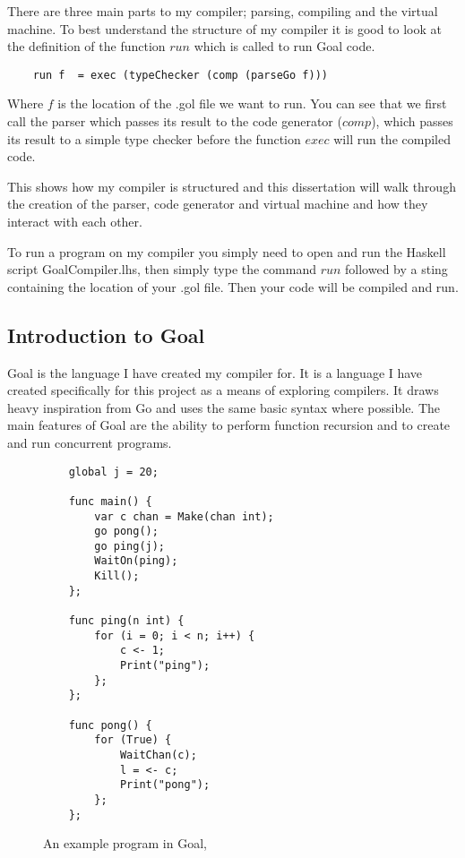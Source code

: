 There are three main parts to my compiler; parsing, compiling and the virtual machine. To best understand the structure of my compiler it is good to look at the definition of the function $run$ which is called to run Goal code.

\begin{lstlisting}
 	run f  = exec (typeChecker (comp (parseGo f)))
\end{lstlisting}

Where $f$ is the location of the .gol file we want to run. You can see that we first call the parser which passes its result to the code generator ($comp$), which passes its result to a simple type checker before the function $exec$ will run the compiled code. 

This shows how my compiler is structured and this dissertation will walk through the creation of the parser, code generator and virtual machine and how they interact with each other.

To run a program on my compiler you simply need to open and run the Haskell script GoalCompiler.lhs, then simply type the command $run$ followed by a sting containing the location of your .gol file. Then your code will be compiled and run. 

\subsection{Introduction to Goal}

Goal is the language I have created my compiler for. It is a language I have created specifically for this project as a means of exploring compilers. It draws heavy inspiration from Go and uses the same basic syntax where possible. The main features of Goal are the ability to perform function recursion and to create and run concurrent programs.

\begin{figure}[h]
\begin{lstlisting}
	global j = 20;
	
	func main() { 
	    var c chan = Make(chan int);
	    go pong();
	    go ping(j);
	    WaitOn(ping);
	    Kill();
	};
	
	func ping(n int) {
	    for (i = 0; i < n; i++) {
	        c <- 1;
	        Print("ping");
	    };    
	};
	
	func pong() {
	    for (True) {
	        WaitChan(c);
	        l = <- c;
	        Print("pong");
	    };    
	};
\end{lstlisting}
\caption{An example program in Goal, }
\label{fig:goalExample} 
\end{figure}


